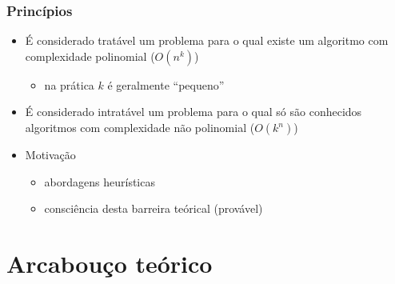 \documentclass{beamer}
\begin{document}

\begin{frame}
\frametitle{Princípios}

\begin{itemize}
\item É considerado \alert{tratável} um problema para o qual existe um
  algoritmo com complexidade polinomial ($O(n^k)$)
  \begin{itemize}
  \item na prática $k$ é geralmente ``pequeno''
  \end{itemize}
\item É considerado \alert{intratável} um problema para o qual só são conhecidos
  algoritmos com complexidade não polinomial ($O(k^n)$)
\item Motivação
  \begin{itemize}
  \item abordagens heurísticas
  \item consciência desta barreira teórical (provável)
  \end{itemize}
\end{itemize}

\end{frame}

\section{Arcabouço teórico}
\end{document}
